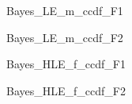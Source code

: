 \documentclass[a4j,11pt,mc, twocolumn]{jreport}
\begin{document}

	\begin{figure}[h!]
		\begin{center}
				\caption{Bayes\_LE\_m\_ccdf\_F1}
		\end{center}
	\end{figure}


	\begin{figure}[h!]
		\begin{center}
				\caption{Bayes\_LE\_m\_ccdf\_F2}
		\end{center}
	\end{figure}




	\begin{figure}[h!]
		\begin{center}
				\caption{Bayes\_HLE\_f\_ccdf\_F1}
		\end{center}
	\end{figure}



	\begin{figure}[h!]
		\begin{center}
				\caption{Bayes\_HLE\_f\_ccdf\_F2}
		\end{center}
	\end{figure}
\end{document}

